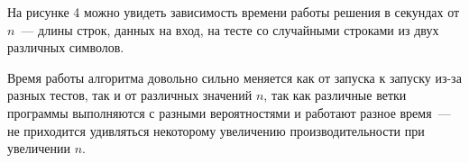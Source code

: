 На рисунке 4 можно увидеть зависимость времени работы решения в секундах от $n$~--- длины строк, данных на вход, на тесте со случайными строками из двух различных символов.

Время работы алгоритма довольно сильно меняется как от запуска к запуску из-за разных тестов, так и от различных значений $n$, так как различные ветки программы выполняются с разными вероятностями и работают разное время~--- не приходится удивляться некоторому увеличению производительности при увеличении $n$.
